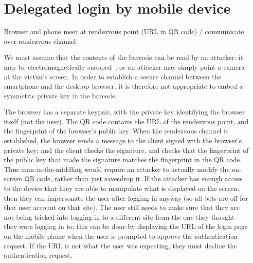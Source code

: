 \section{Delegated login by mobile device}
Browser and phone meet at rendezvous point (URL in QR code) / communicate over rendezvous channel

We must assume that the contents of the barcode can be read by an attacker: it may be
electromagnetically snooped~\cite{Kuhn05}, or an attacker may simply point a camera at the victim's
screen. In order to establish a secure channel between the smartphone and the desktop browser, it is
therefore not appropriate to embed a symmetric private key in the barcode.

The browser has a separate keypair, with the private key identifying the browser itself (not the
user). The QR code contains the URL of the rendezvous point, and the fingerprint of the browser's
public key. When the rendezvous channel is established, the browser sends a message to the client
signed with the browser's private key; and the client checks the signature, and checks that the
fingerprint of the public key that made the signature matches the fingerprint in the QR code. Thus
man-in-the-middling would require an attacker to actually modify the on-screen QR code, rather than
just eavesdrop it. If the attacker has enough access to the device that they are able to manipulate
what is displayed on the screen, then they can impersonate the user after logging in anyway (so all
bets are off for that user account on that site). The user still needs to make sure that they are
not being tricked into logging in to a different site from the one they thought they were logging in
to; this can be done by displaying the URL of the login page on the mobile phone when the user is
prompted to approve the authentication request. If the URL is not what the user was expecting, they
must decline the authentication request.
